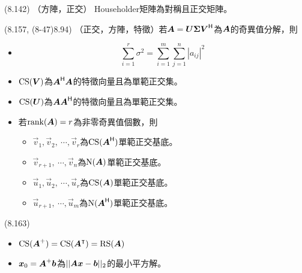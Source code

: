 \item \begin{theorem}{(8.142)} （方陣，正交） Householder矩陣為對稱且正交矩陣。
\end{theorem}

\item \begin{theorem}{(8.157, (8-47)8.94)} （正交，方陣，特徵）若$\boldsymbol{A} = \boldsymbol{U\Sigma V}^{\mathsf{H}}$為$\boldsymbol{A}$的奇異值分解，則
	\begin{itemize}
		\item \begin{equation}
			\sum_{i = 1}^{r} \sigma^2 = \sum_{i = 1}^{m}\sum_{j = 1}^{n}|a_{ij}|^{2}
		\end{equation}
		\item $\operatorname{CS}(\boldsymbol{V})$為$\boldsymbol{A}^{\mathsf{H}}\boldsymbol{A}$的特徵向量且為單範正交集。
		\item $\operatorname{CS}(\boldsymbol{U})$為$\boldsymbol{A}\boldsymbol{A}^{\mathsf{H}}$的特徵向量且為單範正交集。
		\item 若$\operatorname{rank}(\boldsymbol{A}) = r$為非零奇異值個數，則 \begin{itemize}
			\item $\vec{v}_1, \vec{v}_2, \ \cdots, \vec{v}_r$為$\operatorname{CS}(\boldsymbol{A}^{\mathsf{H}})$單範正交基底。
			\item $\vec{v}_{r + 1}, \ \cdots, \vec{v}_n$為$\operatorname{N}(\boldsymbol{A})$單範正交基底。
			\item $\vec{u}_1, \vec{u}_2, \ \cdots, \vec{u}_r$為$\operatorname{CS}(\boldsymbol{A})$單範正交基底。
			\item $\vec{u}_{r + 1}, \ \cdots, \vec{u}_m$為$\operatorname{N}(\boldsymbol{A}^{\mathsf{H}})$單範正交基底。 
		\end{itemize}
	\end{itemize}
\end{theorem}

\item \begin{theorem}{(8.163)} \quad\quad \begin{itemize}
		\item $\operatorname{CS}(\boldsymbol{A}^+) = \operatorname{CS}(\boldsymbol{A}^\intercal) = \operatorname{RS}(\boldsymbol{A})$
		\item $\boldsymbol{x}_0 = \boldsymbol{A}^+ \boldsymbol{b}$為$||\boldsymbol{A}\boldsymbol{x} - \boldsymbol{b}||_2$的最小平方解。
	\end{itemize}
\end{theorem}
